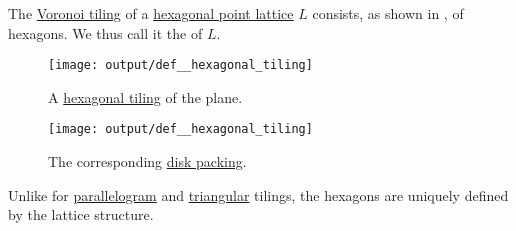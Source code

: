 \begin{definition}\label{def:hexagonal_tiling}\mimprovised
  The \hyperref[def:voronoi_tiling]{Voronoi tiling} of a \hyperref[def:hexagonal_point_lattice]{hexagonal point lattice} \( L \) consists, as shown in , of hexagons. We thus call it the  of \( L \).

  \begin{figure}[!ht]
    \begin{subcaptionblock}[t]{0.45\linewidth}
      \centering
      \texttt{[image: output/def\_\_hexagonal\_tiling]}
      \caption{A \hyperref[def:hexagonal_tiling]{hexagonal tiling} of the plane.}\label{fig:def:hexagonal_tiling/tiling}
    \end{subcaptionblock}
    \hfill
    \begin{subcaptionblock}[t]{0.45\linewidth}
      \centering
      \texttt{[image: output/def\_\_hexagonal\_tiling]}
      \caption{The corresponding \hyperref[def:lattice_ball_packing]{disk packing}.}\label{fig:def:hexagonal_tiling/packing}
    \end{subcaptionblock}
  \end{figure}
\end{definition}
\begin{comments}
  \item Unlike for \hyperref[def:parallelogram_tiling]{parallelogram} and \hyperref[def:triangular_tiling]{triangular} tilings, the hexagons are uniquely defined by the lattice structure.
\end{comments}
